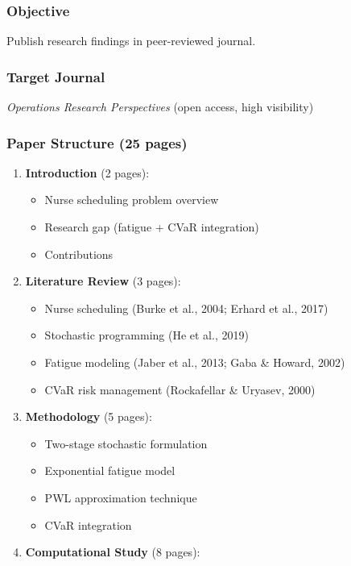 \documentclass[11pt,letterpaper]{article}
\begin{document}
\subsubsection{Objective}
Publish research findings in peer-reviewed journal.

\subsubsection{Target Journal}
\textit{Operations Research Perspectives} (open access, high visibility)

\subsubsection{Paper Structure (25 pages)}
\begin{enumerate}[leftmargin=*]
    \item \textbf{Introduction} (2 pages):
    \begin{itemize}[leftmargin=*]
        \item Nurse scheduling problem overview
        \item Research gap (fatigue + CVaR integration)
        \item Contributions
    \end{itemize}
    \item \textbf{Literature Review} (3 pages):
    \begin{itemize}[leftmargin=*]
        \item Nurse scheduling (Burke et al., 2004; Erhard et al., 2017)
        \item Stochastic programming (He et al., 2019)
        \item Fatigue modeling (Jaber et al., 2013; Gaba \& Howard, 2002)
        \item CVaR risk management (Rockafellar \& Uryasev, 2000)
    \end{itemize}
    \item \textbf{Methodology} (5 pages):
    \begin{itemize}[leftmargin=*]
        \item Two-stage stochastic formulation
        \item Exponential fatigue model
        \item PWL approximation technique
        \item CVaR integration
    \end{itemize}
    \item \textbf{Computational Study} (8 pages):
    \begin{itemize}[leftmargin=*]

\end{itemize}
\end{enumerate}
\end{document}
